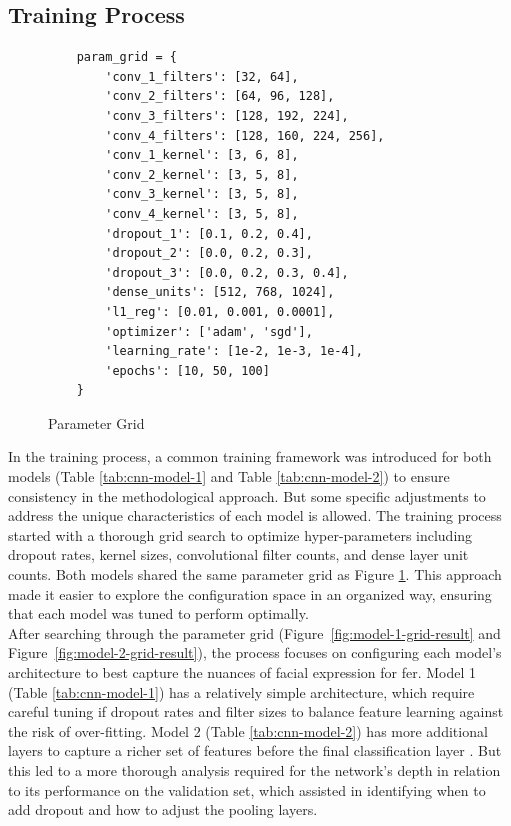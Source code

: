 \subsection{Training Process}
\begin{figure}[h!] 
    \centering
\begin{verbatim}
    param_grid = {
        'conv_1_filters': [32, 64],
        'conv_2_filters': [64, 96, 128],
        'conv_3_filters': [128, 192, 224],
        'conv_4_filters': [128, 160, 224, 256],
        'conv_1_kernel': [3, 6, 8],
        'conv_2_kernel': [3, 5, 8],
        'conv_3_kernel': [3, 5, 8],
        'conv_4_kernel': [3, 5, 8],
        'dropout_1': [0.1, 0.2, 0.4],
        'dropout_2': [0.0, 0.2, 0.3],
        'dropout_3': [0.0, 0.2, 0.3, 0.4],
        'dense_units': [512, 768, 1024],
        'l1_reg': [0.01, 0.001, 0.0001],
        'optimizer': ['adam', 'sgd'],
        'learning_rate': [1e-2, 1e-3, 1e-4], 
        'epochs': [10, 50, 100]
    }
\end{verbatim}
    \caption{Parameter Grid}
    \label{fig:param_grid}
\end{figure}
In the training process, a common training framework was introduced for both models (Table \ref{tab:cnn-model-1} and Table \ref{tab:cnn-model-2}) to ensure consistency in the methodological approach.
But some specific adjustments to address the unique characteristics of each model is allowed.
The training process started with a thorough grid search to optimize hyper-parameters including dropout rates, kernel sizes, convolutional filter counts, and dense layer unit counts.
Both models shared the same parameter grid as Figure \ref{fig:param_grid}.
This approach made it easier to explore the configuration space in an organized way, ensuring that each model was tuned to perform optimally.
\\
\indent After searching through the parameter grid (Figure~\ref{fig:model-1-grid-result} and Figure~\ref{fig:model-2-grid-result}), the process focuses on configuring each model's architecture to best capture the nuances of facial expression for \gls{fer}.
Model 1 (Table \ref{tab:cnn-model-1}) has a relatively simple architecture, which require careful tuning if dropout rates and filter sizes to balance feature learning against the risk of over-fitting.
Model 2 (Table \ref{tab:cnn-model-2}) has more additional layers to capture a richer set of features before the final classification layer . 
But this led to a more thorough analysis required for the network's depth in relation to its performance on the validation set, which assisted in identifying when to add dropout and how to adjust the pooling layers.  
